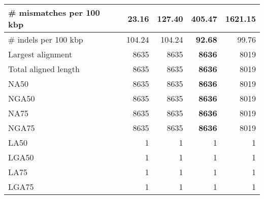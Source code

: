 \documentclass[12pt,a4paper]{article}
\begin{document}
\begin{table}[ht]
\begin{center}
\begin{tabular}{|l*{4}{|r}|}
\# mismatches per 100 kbp & {\bf 23.16} & 127.40 & 405.47 & 1621.15 \\ \hline
\# indels per 100 kbp & 104.24 & 104.24 & {\bf 92.68} & 99.76 \\ \hline
Largest alignment & 8635 & 8635 & {\bf 8636} & 8019 \\ \hline
Total aligned length & 8635 & 8635 & {\bf 8636} & 8019 \\ \hline
NA50 & 8635 & 8635 & {\bf 8636} & 8019 \\ \hline
NGA50 & 8635 & 8635 & {\bf 8636} & 8019 \\ \hline
NA75 & 8635 & 8635 & {\bf 8636} & 8019 \\ \hline
NGA75 & 8635 & 8635 & {\bf 8636} & 8019 \\ \hline
LA50 & 1 & 1 & 1 & 1 \\ \hline
LGA50 & 1 & 1 & 1 & 1 \\ \hline
LA75 & 1 & 1 & 1 & 1 \\ \hline
LGA75 & 1 & 1 & 1 & 1 \\ \hline
\end{tabular}
\end{center}
\end{table}
\end{document}
